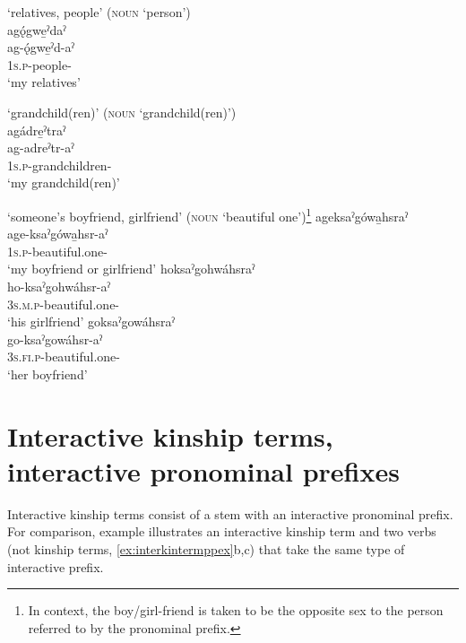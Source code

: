 \ea\label{ex:kintermppex10}  ‘relatives, people’ (\textsc{noun}  ‘person’)\\
agǫ́gwe̱ˀdaˀ\\
\gll ag-ǫ́gwe̱ˀd-aˀ\\
 \textsc{1s.p}-people-{\nounstemformer}\\
\glt `my relatives'
\z


\ea\label{ex:kintermppex310}  ‘grandchild(ren)’ (\textsc{noun}  ‘grandchild(ren)’)\\
agádre̱ˀtraˀ \\
\gll ag-adreˀtr-aˀ\\
\textsc{1s.p}-grandchildren-{\nounstemformer}\\
\glt ‘my grandchild(ren)’
\z


\ea\label{ex:interkintermppex30}  ‘someone’s boyfriend, girlfriend’ (\textsc{noun}  ‘beautiful one’)\footnote{In context, the boy/girl-friend is taken to be the opposite sex to the person referred to by the pronominal prefix.}
\ea ageksaˀgówa̱hsraˀ\\
\gll age-ksaˀgówa̱hsr-aˀ\\
 \textsc{1s.p}-beautiful.one-{\nounstemformer}\\
\glt `my boyfriend or girlfriend'
\ex hoksaˀgohwáhsraˀ\\
\gll ho-ksaˀgohwáhsr-aˀ\\
\textsc{3s.m.p}-beautiful.one-{\nounstemformer}\\
\glt `his girlfriend'
\ex goksaˀgowáhsraˀ\\
\gll go-ksaˀgowáhsr-aˀ\\
 \textsc{3s.fi.p}-beautiful.one-{\nounstemformer}\\
\glt `her boyfriend'
\z
\z

\section{Interactive kinship terms, interactive pronominal prefixes} \label{ch:Interactive kinship terms, interactive pronominal prefixes}
Interactive kinship terms consist of a stem with an interactive pronominal prefix. For comparison, example  illustrates an interactive kinship term  and two verbs (not kinship terms, \ref{ex:interkintermppex}b,c) that take the same type of interactive prefix.  

